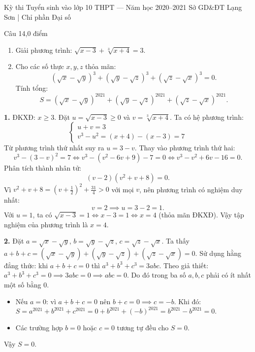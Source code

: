 ﻿%
%
  {Kỳ thi Tuyển sinh vào lớp 10 THPT — Năm học 2020--2021}%
  {Sở GD\&ĐT Lạng Sơn | Chỉ phần Đại số}

\begin{de_cau}{Câu 1}{4,0 điểm}
\begin{enumerate}[label=\arabic*.]
\item Giải phương trình: $\sqrt{x-3} + \sqrt[3]{x+4} = 3$.
\item Cho các số thực $x, y, z$ thỏa mãn:
\[(\sqrt{x}-\sqrt{y})^3 + (\sqrt{y}-\sqrt{z})^3 + (\sqrt{z}-\sqrt{x})^3 = 0.\]
Tính tổng:
\[S = (\sqrt{x}-\sqrt{y})^{2021} + (\sqrt{y}-\sqrt{z})^{2021} + (\sqrt{z}-\sqrt{x})^{2021}.\]
\end{enumerate}
\end{de_cau}

\begin{loi_giai_cau}
\textbf{1.} ĐKXĐ: $x \ge 3$.
Đặt $u = \sqrt{x-3} \ge 0$ và $v = \sqrt[3]{x+4}$. Ta có hệ phương trình:
\[\begin{cases} u + v = 3 \\ v^3 - u^2 = (x+4) - (x-3) = 7 \end{cases}\]
Từ phương trình thứ nhất suy ra $u = 3 - v$. Thay vào phương trình thứ hai:
\[v^3 - (3-v)^2 = 7 \iff v^3 - (v^2 - 6v + 9) - 7 = 0 \iff v^3 - v^2 + 6v - 16 = 0.\]
Phân tích thành nhân tử:
\[(v-2)(v^2 + v + 8) = 0.\]
Vì $v^2 + v + 8 = \left(v + \frac{1}{2}\right)^2 + \frac{31}{4} > 0$ với mọi $v$, nên phương trình có nghiệm duy nhất:
\[v = 2 \implies u = 3 - 2 = 1.\]
Với $u = 1$, ta có $\sqrt{x-3} = 1 \iff x - 3 = 1 \iff x = 4$ (thỏa mãn ĐKXĐ).
Vậy tập nghiệm của phương trình là $\boxed{x = 4}$.

\textbf{2.} Đặt $a = \sqrt{x}-\sqrt{y}$, $b = \sqrt{y}-\sqrt{z}$, $c = \sqrt{z}-\sqrt{x}$.
Ta thấy $a + b + c = (\sqrt{x}-\sqrt{y}) + (\sqrt{y}-\sqrt{z}) + (\sqrt{z}-\sqrt{x}) = 0$.
Sử dụng hằng đẳng thức: khi $a+b+c=0$ thì $a^3+b^3+c^3 = 3abc$.
Theo giả thiết: $a^3+b^3+c^3 = 0 \implies 3abc = 0 \implies abc = 0$.
Do đó trong ba số $a, b, c$ phải có ít nhất một số bằng 0.
\begin{itemize}
\item Nếu $a = 0$: vì $a+b+c=0$ nên $b + c = 0 \implies c = -b$.
Khi đó: $S = a^{2021} + b^{2021} + c^{2021} = 0 + b^{2021} + (-b)^{2021} = b^{2021} - b^{2021} = 0$.
\item Các trường hợp $b = 0$ hoặc $c = 0$ tương tự đều cho $S = 0$.
\end{itemize}
Vậy $\boxed{S = 0}$.
\end{loi_giai_cau}

